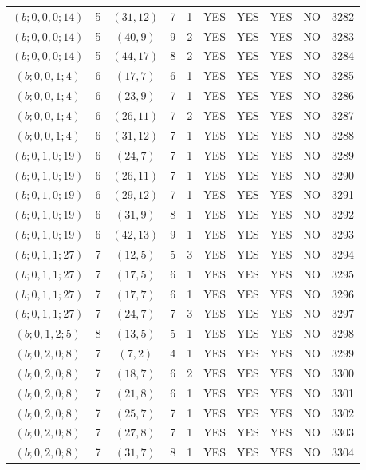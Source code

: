 \begin{longtable}{|c|c|c|c|c|c|c|c|c|c|}
$(b; 0, 0, 0; 14)$ & 5 & $(31, 12)$ & 7 & 1 & YES & YES & YES & NO & 3282\\
$(b; 0, 0, 0; 14)$ & 5 & $(40, 9)$ & 9 & 2 & YES & YES & YES & NO & 3283\\
$(b; 0, 0, 0; 14)$ & 5 & $(44, 17)$ & 8 & 2 & YES & YES & YES & NO & 3284\\
$(b; 0, 0, 1; 4)$ & 6 & $(17, 7)$ & 6 & 1 & YES & YES & YES & NO & 3285\\
$(b; 0, 0, 1; 4)$ & 6 & $(23, 9)$ & 7 & 1 & YES & YES & YES & NO & 3286\\
$(b; 0, 0, 1; 4)$ & 6 & $(26, 11)$ & 7 & 2 & YES & YES & YES & NO & 3287\\
$(b; 0, 0, 1; 4)$ & 6 & $(31, 12)$ & 7 & 1 & YES & YES & YES & NO & 3288\\
$(b; 0, 1, 0; 19)$ & 6 & $(24, 7)$ & 7 & 1 & YES & YES & YES & NO & 3289\\
$(b; 0, 1, 0; 19)$ & 6 & $(26, 11)$ & 7 & 1 & YES & YES & YES & NO & 3290\\
$(b; 0, 1, 0; 19)$ & 6 & $(29, 12)$ & 7 & 1 & YES & YES & YES & NO & 3291\\
$(b; 0, 1, 0; 19)$ & 6 & $(31, 9)$ & 8 & 1 & YES & YES & YES & NO & 3292\\
$(b; 0, 1, 0; 19)$ & 6 & $(42, 13)$ & 9 & 1 & YES & YES & YES & NO & 3293\\
$(b; 0, 1, 1; 27)$ & 7 & $(12, 5)$ & 5 & 3 & YES & YES & YES & NO & 3294\\
$(b; 0, 1, 1; 27)$ & 7 & $(17, 5)$ & 6 & 1 & YES & YES & YES & NO & 3295\\
$(b; 0, 1, 1; 27)$ & 7 & $(17, 7)$ & 6 & 1 & YES & YES & YES & NO & 3296\\
$(b; 0, 1, 1; 27)$ & 7 & $(24, 7)$ & 7 & 3 & YES & YES & YES & NO & 3297\\
$(b; 0, 1, 2; 5)$ & 8 & $(13, 5)$ & 5 & 1 & YES & YES & YES & NO & 3298\\
$(b; 0, 2, 0; 8)$ & 7 & $(7, 2)$ & 4 & 1 & YES & YES & YES & NO & 3299\\
$(b; 0, 2, 0; 8)$ & 7 & $(18, 7)$ & 6 & 2 & YES & YES & YES & NO & 3300\\
$(b; 0, 2, 0; 8)$ & 7 & $(21, 8)$ & 6 & 1 & YES & YES & YES & NO & 3301\\
$(b; 0, 2, 0; 8)$ & 7 & $(25, 7)$ & 7 & 1 & YES & YES & YES & NO & 3302\\
$(b; 0, 2, 0; 8)$ & 7 & $(27, 8)$ & 7 & 1 & YES & YES & YES & NO & 3303\\
$(b; 0, 2, 0; 8)$ & 7 & $(31, 7)$ & 8 & 1 & YES & YES & YES & NO & 3304\\

\end{longtable}
